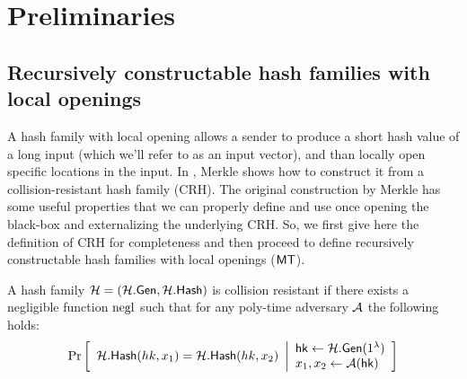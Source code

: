\section{Preliminaries}
\label{sec:prelim}

%

%

%

\subsection{Recursively constructable hash families with local openings}
A hash family with local opening allows a sender to produce a short hash value of a long input (which we'll refer to as an input vector), and than locally open specific locations in the input. In \cite{merkle1989certified}, Merkle shows how to construct it from a collision-resistant hash family (CRH). The original construction by Merkle has some useful properties that we can properly define and use once opening the black-box and externalizing the underlying CRH. So, we first give here the definition of CRH for completeness and then proceed to define recursively constructable hash families with local openings ($\mathsf{MT}$).

\begin{definition}
    A hash family $\mathcal{H} = (\mathcal{H}.\mathsf{Gen}, \mathcal{H}.\mathsf{Hash})$ is collision resistant if there exists a negligible function $\operatorname{negl}$ such that for any poly-time adversary $\mathcal{A}$ the following holds:
    \begin{gather*}
        \Pr \left[ \begin{array}{ll} 
        \mathcal{H}.\mathsf{Hash}(hk, x_1) = \mathcal{H}.\mathsf{Hash}(hk, x_2)
         \end{array} \middle\vert \begin{array}{ll} 
        \mathsf{hk}\leftarrow \mathcal{H}.\mathsf{Gen}(1^\lambda) \\
        x_1, x_2 \leftarrow \mathcal{A}(\mathsf{hk}) \end{array} \right]
    \end{gather*}
\end{definition}

